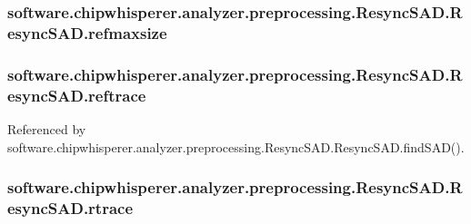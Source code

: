 \subsubsection[{refmaxsize}]{\setlength{\rightskip}{0pt plus 5cm}software.\+chipwhisperer.\+analyzer.\+preprocessing.\+Resync\+S\+A\+D.\+Resync\+S\+A\+D.\+refmaxsize}\label{classsoftware_1_1chipwhisperer_1_1analyzer_1_1preprocessing_1_1ResyncSAD_1_1ResyncSAD_a9afd928860ee6220510e06d8bdb08f7e}
\hypertarget{classsoftware_1_1chipwhisperer_1_1analyzer_1_1preprocessing_1_1ResyncSAD_1_1ResyncSAD_aac6512c5af7c7e57164ef69250ffbef2}{}
\subsubsection[{reftrace}]{\setlength{\rightskip}{0pt plus 5cm}software.\+chipwhisperer.\+analyzer.\+preprocessing.\+Resync\+S\+A\+D.\+Resync\+S\+A\+D.\+reftrace}\label{classsoftware_1_1chipwhisperer_1_1analyzer_1_1preprocessing_1_1ResyncSAD_1_1ResyncSAD_aac6512c5af7c7e57164ef69250ffbef2}


Referenced by software.\+chipwhisperer.\+analyzer.\+preprocessing.\+Resync\+S\+A\+D.\+Resync\+S\+A\+D.\+find\+S\+A\+D().

\hypertarget{classsoftware_1_1chipwhisperer_1_1analyzer_1_1preprocessing_1_1ResyncSAD_1_1ResyncSAD_a91390c7802ffd310f3dde60e0242a253}{}
\subsubsection[{rtrace}]{\setlength{\rightskip}{0pt plus 5cm}software.\+chipwhisperer.\+analyzer.\+preprocessing.\+Resync\+S\+A\+D.\+Resync\+S\+A\+D.\+rtrace}\label{classsoftware_1_1chipwhisperer_1_1analyzer_1_1preprocessing_1_1ResyncSAD_1_1ResyncSAD_a91390c7802ffd310f3dde60e0242a253}


